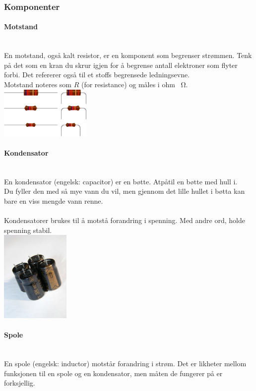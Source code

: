 \subsubsection{Komponenter}
\paragraph{Motstand} \mbox{} \\
En motstand, også kalt resistor, er en komponent som begrenser strømmen.
Tenk på det som en kran du skrur igjen for å begrense antall elektroner som flyter forbi.
Det refererer også til et stoffs begrensede ledningsevne.
\\
Motstand noteres som $R$ (for resistance) og måles i ohm \SI{}{\ohm}.
\\
\includegraphics[width=0.33\textwidth]{./img/resistor}

\paragraph{Kondensator} \mbox{} \\
En kondensator (engelsk: capacitor) er en bøtte. Atpåtil en bøtte med hull i.
\\
Du fyller den med så mye vann du vil, men gjennom det lille hullet i bøtta kan bare en viss mengde vann renne.
\\\\
Kondensatorer brukes til å motstå forandring i spenning.
Med andre ord, holde spenning stabil.
\\
\includegraphics[width=0.25\textwidth]{./img/kondensator}

\paragraph{Spole} \mbox{} \\
En spole (engelsk: inductor) motstår forandring i strøm.
Det er likheter mellom funksjonen til en spole og en kondensator, men måten de fungerer på er forksjellig.
